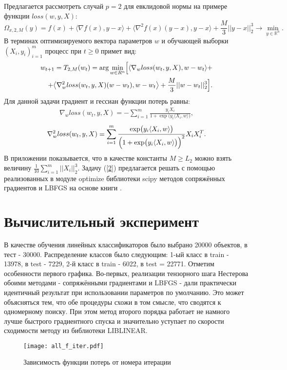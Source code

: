 \documentclass[12pt,twoside]{article}
\begin{document}
	Предлагается рассмотреть случай $p = 2$ для евклидовой нормы на примере функции $loss(w, y, X)$:
	\begin{equation}
	\Omega_{x, 2, M}(y) = f(x) +  \langle \nabla f(x), y - x \rangle + \bigl \langle \nabla^2 f(x)(y - x), y - x \bigr \rangle + \frac{M}{3}||y - x||_2^3 \to \min_{y \in \mathbb{R}^n}.
	\end{equation}
	В терминах оптимизируемого вектора параметров $w$ и обучающей выборки $(X_i, y_i)_{i = 1}^m$ процесс при $t \geq 0$ примет вид:
	\begin{eqnarray} \label{2}
	w_{t + 1} = T_{2, M}(w_t) = \arg\min_{w \in R^n} \Bigl[\langle \nabla_w loss(w_t, y, X), w - w_t \rangle + \nonumber \\ + \bigl \langle \nabla_w^2 loss(w_t, y, X)(w - w_t), w - w_t \bigr \rangle + \frac{M}{3}||w - w_t||_2^3 \Bigr].
	\end{eqnarray}
	Для данной задачи градиент и гессиан функции потерь равны:
	\begin{eqnarray} \label{3}
	\nabla_w loss(w_t, y, X) = -\sum\limits_{i = 1}^m \frac{y_iX_i}{1 + \exp\bigl(y_i\langle X_i, w \rangle\bigr)},
	\end{eqnarray}
	\begin{eqnarray} \label{4}
	\nabla_w^2 loss(w_t, y, X) = \sum\limits_{i = 1}^m \frac{\exp\bigl(y_i\langle X_i, w \rangle\bigr)}{\Bigl(1 + \exp\bigl(y_i\langle X_i, w \rangle\bigr)\Bigr)^2}X_iX_i^T.
	\end{eqnarray}
	В приложении показывается, что в качестве константы $M \geq L_2$ можно взять величину $\frac{1}{10}\sum\limits_{i = 1}^m ||X_i||_2^3$. Задачу (\ref{2}) предлагается решать с помощью реализованных в модуле optimize библиотеки scipy методов сопряжённых градиентов и LBFGS на основе книги \cite{wright2006numerical}.
	\section{Вычислительный эксперимент}
	В качестве обучения линейных классификаторов было выбрано 20000 объектов, в тест - 30000. Распределение классов было следующим: 1-ый класс в train - 13978, в test - 7229, 2-й класс в train - 6022, в test = 22771. Отметим особенности первого графика. Во-первых, реализации тензорного шага Нестерова обоими методами - сопряжёнными градиентами и LBFGS - дали практически идентичный результат при использовании параметров по умолчанию. Это может объясняться тем, что обе процедуры схожи в том смысле, что сводятся к одномерному поиску. При этом метод второго порядка работает не намного лучше быстрого градиентного спуска и значительно уступает по скорости сходимости методу из библиотеки LIBLINEAR.
	\begin{figure}[h]
		\begin{center}
			\caption{Зависимость функции потерь от номера итерации}
		\texttt{[image: all\_f\_iter.pdf]}
	\end{center}
	\end{figure}
\end{document}
